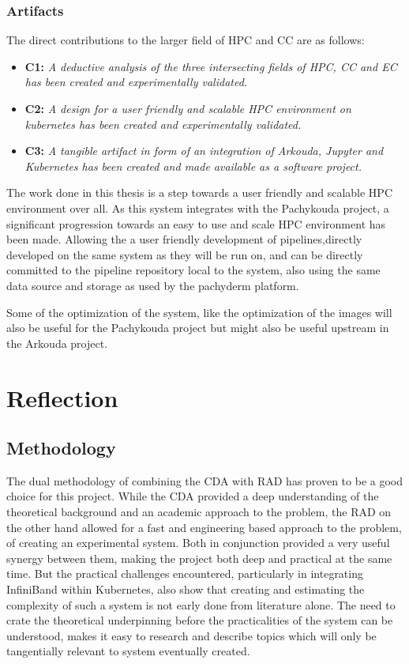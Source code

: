 \subsubsection{Artifacts}

The direct contributions to the larger field of \ac{HPC} and \ac{CC} are as follows:

\begin{itemize}
    \item \textbf{C1:} \textit{ A deductive analysis of the three intersecting fields of \ac{HPC}, \ac{CC} and \ac{EC} has been created and experimentally validated.}
    \item \textbf{C2:} \textit{ A design for a user friendly and scalable HPC environment on kubernetes has been created and experimentally validated.}
    \item \textbf{C3:} \textit{ A tangible artifact in form of an integration of Arkouda, Jupyter and Kubernetes has been created and made available as a software project.}
\end{itemize}

The work done in this thesis is a step towards a user friendly and scalable \ac{HPC} environment over all.
As this system integrates with the Pachykouda project, a significant progression towards an easy
to use and scale HPC environment has been made.
Allowing the a user friendly development of pipelines,directly developed on the same system as they will be run on,
and can be directly committed to the pipeline repository local to the system, also using the same data source and storage
as used by the pachyderm platform.

Some of the optimization of the system, like the optimization of the images will also be
useful for the Pachykouda project but might also be useful upstream in the Arkouda project.

\section{Reflection}


\subsection{Methodology}

The dual methodology of combining the \ac{CDA} with \ac{RAD} has proven to be a good choice for this project.
While the \ac{CDA} provided a deep understanding of the theoretical background and an academic approach to the problem,
the \ac{RAD} on the other hand allowed for a fast and engineering based approach to the problem, of creating an experimental system.
Both in conjunction provided a very useful synergy between them, making the project both deep and practical at the same time.
But the practical challenges encountered, particularly in integrating InfiniBand within Kubernetes,
also show that creating and estimating the complexity of such a system is not early done from literature alone.
The need to crate the theoretical underpinning before the practicalities of the system can be understood,
makes it easy to research and describe topics which will only be tangentially relevant to system eventually created.

